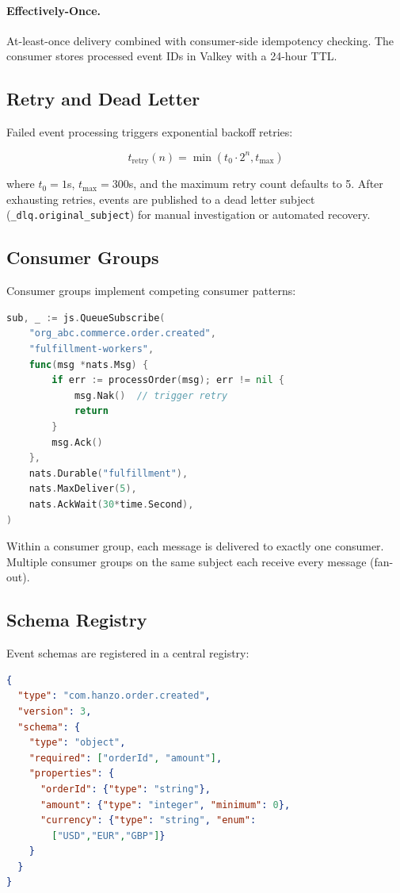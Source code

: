 \documentclass[11pt,twocolumn]{article}
\begin{document}
\paragraph{Effectively-Once.} At-least-once delivery combined with consumer-side idempotency checking. The consumer stores processed event IDs in Valkey with a 24-hour TTL.

\subsection{Retry and Dead Letter}

Failed event processing triggers exponential backoff retries:

\begin{equation}
    t_{\text{retry}}(n) = \min(t_0 \cdot 2^n, t_{\max})
\end{equation}

where $t_0 = 1$s, $t_{\max} = 300$s, and the maximum retry count defaults to 5. After exhausting retries, events are published to a dead letter subject (\texttt{\_dlq.{original\_subject}}) for manual investigation or automated recovery.

\subsection{Consumer Groups}

Consumer groups implement competing consumer patterns:

\begin{lstlisting}[language=Go]
sub, _ := js.QueueSubscribe(
    "org_abc.commerce.order.created",
    "fulfillment-workers",
    func(msg *nats.Msg) {
        if err := processOrder(msg); err != nil {
            msg.Nak()  // trigger retry
            return
        }
        msg.Ack()
    },
    nats.Durable("fulfillment"),
    nats.MaxDeliver(5),
    nats.AckWait(30*time.Second),
)
\end{lstlisting}

Within a consumer group, each message is delivered to exactly one consumer. Multiple consumer groups on the same subject each receive every message (fan-out).

\subsection{Schema Registry}

Event schemas are registered in a central registry:

\begin{lstlisting}[language=JSON]
{
  "type": "com.hanzo.order.created",
  "version": 3,
  "schema": {
    "type": "object",
    "required": ["orderId", "amount"],
    "properties": {
      "orderId": {"type": "string"},
      "amount": {"type": "integer", "minimum": 0},
      "currency": {"type": "string", "enum":
        ["USD","EUR","GBP"]}
    }
  }
}
\end{lstlisting}
\end{document}
